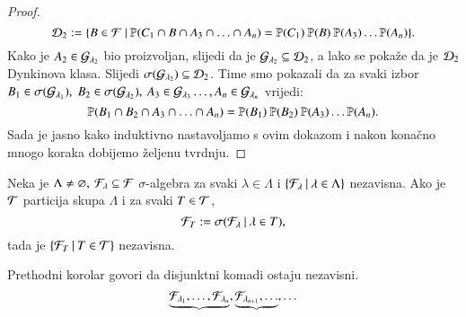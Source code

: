 \begin{proof}
\begin{equation*}
        \mathcal{D}_2 := \{{B \in \mathcal{F}} \: | \: {\mathbb{P}({C_1 \cap B \cap A_3 \cap \ldots \cap A_n}) = \mathbb{P}({C_1}) \: \mathbb{P}({B}) \: \mathbb{P}({A_3}) \ldots \mathbb{P}({A_n})}\}.
    \end{equation*}
    Kako je $A_2 \in \mathcal{G}_{\lambda_2}$ bio proizvoljan, slijedi da je $\mathcal{G}_{\lambda_2} \subseteq \mathcal{D}_2$, a lako se poka\v ze da je $\mathcal{D}_2$ Dynkinova klasa.
    Slijedi $\sigma({\mathcal{G}_{\lambda_2}}) \subseteq \mathcal{D}_2$.
    Time smo pokazali da za svaki izbor $B_1 \in \sigma({\mathcal{G}_{\lambda_1}}), \; B_2 \in \sigma({\mathcal{G}_{\lambda_2}}), \: A_3 \in \mathcal{G}_{\lambda_3} \ldots, A_n \in \mathcal{G}_{\lambda_n}$ vrijedi:
    \begin{equation*}
        \mathbb{P}({B_1 \cap B_2 \cap A_3 \cap \ldots \cap A_n}) = \mathbb{P}({B_1}) \: \mathbb{P}({B_2}) \: \mathbb{P}({A_3}) \ldots \mathbb{P}({A_n}).
    \end{equation*}
    Sada je jasno kako induktivno nastavoljamo s ovim dokazom i nakon kona\v cno mnogo koraka dobijemo \v zeljenu tvrdnju.
\end{proof}

\begin{kor} \label{kor:6.11}
    Neka je $\Lambda \neq \varnothing, \: \mathcal{F}_\lambda \subseteq \mathcal{F}$ $\sigma$-algebra za svaki $\lambda \in \Lambda$ i $\{{\mathcal{F}_\lambda} \: | \: {\lambda \in \Lambda}\}$ nezavisna.
    Ako je $\mathcal{T}$ particija skupa $\Lambda$ i za svaki $T \in \mathcal{T}$,
    \begin{equation*}
        \mathcal{F}_T := \sigma({\mathcal{F}_\lambda} \: | \: {\lambda \in T}),
    \end{equation*}
    tada je $\{{\mathcal{F}_T} \: | \: {T \in \mathcal{T}}\}$ nezavisna.
\end{kor}

\begin{nap}
    Prethodni korolar govori da disjunktni komadi ostaju nezavisni.
    \begin{equation*}
        \underbrace{\mathcal{F}_{\lambda_1}, \ldots, \mathcal{F}_{\lambda_n}} , \underbrace{\mathcal{F}_{\lambda_{n + 1}}, \ldots}, \ldots
    \end{equation*}
\end{nap}

